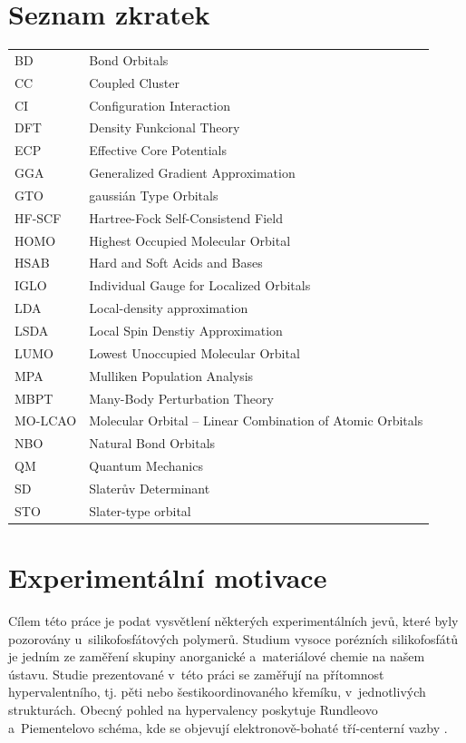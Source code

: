\documentclass[
digital, %
table,   %
lof,     %
lot,     %
oneside,
]{fithesis3}
\begin{document}
\chapter*{Seznam zkratek}
\begin{table}[htbp]
\begin{tabular}{l l}
  BD & Bond Orbitals \\
CC & Coupled Cluster \\
CI & Configuration Interaction \\
DFT & Density Funkcional Theory \\
ECP & Effective Core Potentials \\
GGA &  Generalized Gradient Approximation \\
GTO & gaussián Type Orbitals \\
HF-SCF & Hartree-Fock Self-Consistend Field \\
HOMO  & Highest Occupied Molecular Orbital \\
HSAB & Hard and Soft Acids and Bases \\
IGLO & Individual Gauge for Localized Orbitals \\
LDA & Local-density approximation \\
LSDA & Local Spin Denstiy Approximation \\
LUMO & Lowest Unoccupied Molecular Orbital \\
MPA & Mulliken Population Analysis \\
MBPT &  Many-Body Perturbation Theory \\
MO-LCAO & Molecular Orbital – Linear Combination of Atomic Orbitals \\
NBO & Natural Bond Orbitals \\
QM & Quantum Mechanics \\
SD & Slaterův Determinant \\
STO & Slater-type orbital  \\
\end{tabular}
\end{table}

\chapter{Experimentální motivace}
Cílem této práce je podat vysvětlení některých experimentálních jevů, které byly pozorovány u~silikofosfátových polymerů. Studium vysoce porézních silikofosfátů je jedním ze zaměření skupiny anorganické a~materiálové chemie na našem ústavu. Studie prezentované v~této práci se zaměřují na přítomnost hypervalentního, tj. pěti nebo šestikoordinovaného křemíku, v~jednotlivých strukturách. Obecný pohled na hypervalency poskytuje Rundleovo a~Piementelovo schéma, kde se objevují elektronově-bohaté tří-centerní vazby \cite{405827} \cite{Munzarova2001}.
\end{document}
